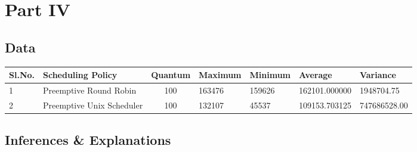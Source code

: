 \documentclass{article}
\begin{document}
\section{Part IV}
\subsection{Data}
\begin{center}
    \begin{tabular}{| l | l | c | l | l | l | l |}
    \hline
    Sl.No. & Scheduling Policy & Quantum & Maximum & Minimum & Average & Variance \\ \hline
    1 & Preemptive Round Robin & 100 & 163476 & 159626 & 162101.000000 & 1948704.75\\
    2 & Preemptive Unix Scheduler & 100 & 132107 & 45537 & 109153.703125 & 747686528.00\\
    \hline
    \end{tabular}
\end{center}
\subsection{Inferences \& Explanations}
\end{document}
